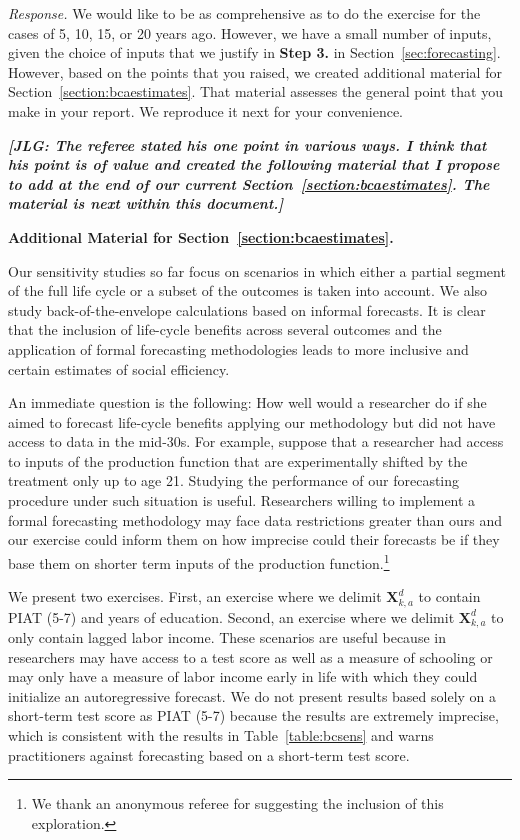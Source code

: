\noindent \textit{Response.} We would like to be as comprehensive as to do the exercise for the cases of 5, 10, 15, or 20 years ago. However, we have a small number of inputs, given the choice of inputs that we justify in \textbf{Step 3.} in Section~\ref{sec:forecasting}. However, based on the points that you raised, we created additional material for Section~\ref{section:bcaestimates}. That material assesses the general point that you make in your report. We reproduce it next for your convenience. 

\textit{\textbf{[JLG: The referee stated his one point in various ways. I think that his point is of value and created the following material that I propose to add at the end of our current Section~\ref{section:bcaestimates}. The material is next within this document.]}}

\pagebreak
\noindent \textbf{Additional Material for Section~\ref{section:bcaestimates}.}

Our sensitivity studies so far focus on scenarios in which either a partial segment of the full life cycle or a subset of the outcomes is taken into account. We also study back-of-the-envelope calculations based on informal forecasts. It is clear that the inclusion of life-cycle benefits across several outcomes and the application of formal forecasting methodologies leads to more inclusive and certain estimates of social efficiency.

An immediate question is the following: How well would a researcher do if she aimed to forecast life-cycle benefits applying our methodology but did not have access to data in the mid-30s. For example, suppose that a researcher had access to inputs of the production function that are experimentally shifted by the treatment only up to age 21. Studying the performance of our forecasting procedure under such situation is useful. Researchers willing to implement a formal forecasting methodology may face data restrictions greater than ours and our exercise could inform them on how imprecise could their forecasts be if they base them on shorter term inputs of the production function.\footnote{We thank an anonymous referee for suggesting the inclusion of this exploration.}

We present two exercises. First, an exercise where we delimit $\bm{X}_{k,a}^d$ to contain PIAT (5-7) and years of education. Second, an exercise where we delimit $\bm{X}_{k,a}^d$ to only contain lagged labor income. These scenarios are useful because in researchers may have access to a test score as well as a measure of schooling or may only have a measure of labor income early in life with which they could initialize an autoregressive forecast. We do not present results based solely on a short-term test score as PIAT (5-7) because the results are extremely imprecise, which is consistent with the results in Table~\ref{table:bcsens} and warns practitioners against forecasting based on a short-term test score. 

